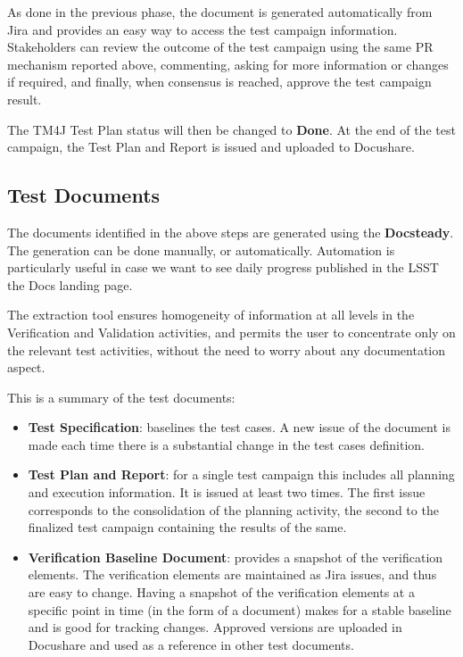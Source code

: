 As done in the previous phase, the document is generated automatically from Jira and provides an easy way to access the test campaign information.
Stakeholders can review the outcome of the test campaign using the same PR mechanism reported above,
commenting, asking for more information or changes if required, and finally, when consensus is reached, approve the test campaign result.

The TM4J Test Plan status will then be changed to \textbf{Done}.
At the end of the test campaign, the Test Plan and Report is issued and uploaded to Docushare.


\subsection{Test Documents}

The documents identified in the above steps are generated using the \textbf{Docsteady}.
The generation can be done manually, or automatically.
Automation is particularly useful in case we want to see daily progress published in the LSST the Docs landing page.

The extraction tool ensures homogeneity of information at all levels in the Verification and Validation activities,
and permits the user to concentrate only on the relevant test activities, without the need to worry about any documentation aspect.

 This is a summary of the test documents:

\begin{itemize}
\item \textbf{Test Specification}:  baselines the test cases.
A new issue of the document is made each time there is a substantial change in the test cases definition.
\item \textbf{Test Plan and Report}:  for a single test campaign this includes all planning and execution information.
It  is issued at least two  times. The first issue corresponds to the consolidation of the planning activity,
the second to the finalized test campaign containing the results of the same.
\item \textbf{Verification Baseline Document}: provides a snapshot of the verification elements.
The verification elements are  maintained as Jira issues, and  thus are easy to change.
Having a snapshot of the verification elements at a specific point in time  (in the form of a document) makes
for a stable baseline and is good for tracking changes.
Approved versions are uploaded in Docushare and used as a reference in other test documents.
\end{itemize}

